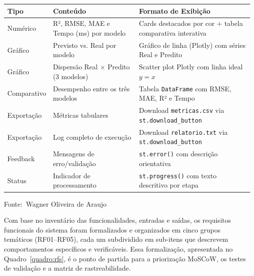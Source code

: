 \documentclass[12pt,a4paper]{article}
\newcommand{\oautor}{Wagner Oliveira de Araujo}
\begin{document}
\begin{quadro}[ht]
\centering
\small
\caption{Saídas esperadas do sistema}
\label{quadro:saidas}
\begin{threeparttable}
\begin{tabularx}{\textwidth}{|l|l|X|} \hline
\textbf{Tipo} & \textbf{Conteúdo} & \textbf{Formato de Exibição} \\ \hline
Numérico & R², RMSE, MAE e Tempo (ms) por modelo & Cards destacados por cor + tabela comparativa interativa \\ \hline
Gráfico & Previsto vs. Real por modelo & Gráfico de linha (Plotly) com séries Real e Predito \\ \hline
Gráfico & Dispersão Real $\times$ Predito (3 modelos) & Scatter plot Plotly com linha ideal $y = x$ \\ \hline
Comparativo & Desempenho entre os três modelos & Tabela \texttt{DataFrame} com RMSE, MAE, R² e Tempo \\ \hline
Exportação & Métricas tabulares & Download \texttt{metricas.csv} via \texttt{st.download\_button} \\ \hline
Exportação & Log completo de execução & Download \texttt{relatorio.txt} via \texttt{st.download\_button} \\ \hline
Feedback & Mensagens de erro/validação & \texttt{st.error()} com descrição orientativa \\ \hline
Status & Indicador de processamento & \texttt{st.progress()} com texto descritivo por etapa \\ \hline
\end{tabularx}
\begin{tablenotes}[flushleft]
\footnotesize
\item Fonte:~\oautor
\end{tablenotes}
\end{threeparttable}
\end{quadro}


Com base no inventário das funcionalidades, entradas e saídas, os requisitos funcionais do sistema foram formalizados e organizados em cinco grupos temáticos (RF01--RF05), cada um subdividido em sub-itens que descrevem comportamentos específicos e verificáveis. Essa formalização, apresentada no Quadro~\ref{quadro:rfs}, é o ponto de partida para a priorização MoSCoW, os testes de validação e a matriz de rastreabilidade.
\end{document}
